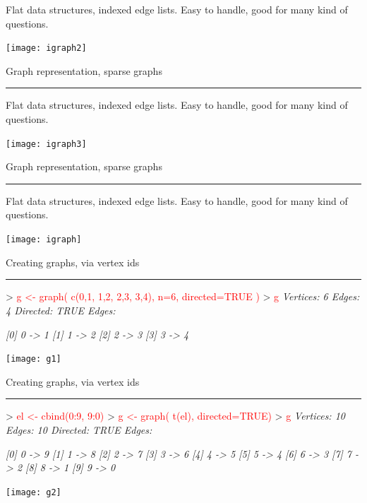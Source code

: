 \documentclass[landscape]{foils}
\newcommand{\stitle}[1]{{\centering\color{blue}\Large #1\par\vspace*{10pt}\hrule}}
\newcommand{\command}[1]{\textcolor{red}{#1}}
\begin{document}
Flat data structures, indexed edge lists. Easy to
handle, good for many kind of questions.
\begin{center}
  \texttt{[image: igraph2]}
\end{center}

\newpage
\stitle{Graph representation, sparse graphs}

Flat data structures, indexed edge lists. Easy to
handle, good for many kind of questions.
\begin{center}
  \texttt{[image: igraph3]}
\end{center}

\newpage
\stitle{Graph representation, sparse graphs}

Flat data structures, indexed edge lists. Easy to
handle, good for many kind of questions.
\begin{center}
  \texttt{[image: igraph]}
\end{center}


\newpage
\stitle{Creating graphs, via vertex ids}
\begin{Myverb}
> \command{g <- graph( c(0,1, 1,2, 2,3, 3,4), n=6, directed=TRUE )}
> \command{g}
\slshape Vertices: 6 
\slshape Edges: 4 
\slshape Directed: TRUE 
\slshape Edges:
          
\slshape [0] 0 -> 1
\slshape [1] 1 -> 2
\slshape [2] 2 -> 3
\slshape [3] 3 -> 4
\end{Myverb}
\begin{flushright}
\vspace*{-6cm}
\texttt{[image: g1]}
\end{flushright}

\newpage
\stitle{Creating graphs, via vertex ids}
\begin{Myverb}
> \command{el <- cbind(0:9, 9:0)}
> \command{g <- graph( t(el), directed=TRUE)}
> \command{g}
\slshape Vertices: 10 
\slshape Edges: 10 
\slshape Directed: TRUE 
\slshape Edges:
          
\slshape [0] 0 -> 9
\slshape [1] 1 -> 8
\slshape [2] 2 -> 7
\slshape [3] 3 -> 6
\slshape [4] 4 -> 5
\slshape [5] 5 -> 4
\slshape [6] 6 -> 3
\slshape [7] 7 -> 2
\slshape [8] 8 -> 1
\slshape [9] 9 -> 0
\end{Myverb}
\begin{flushright}
\vspace*{-11.5cm}
\texttt{[image: g2]}
\end{flushright}
\end{document}
